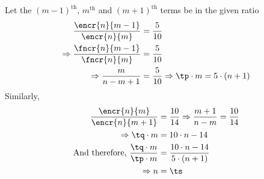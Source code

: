 
\watchout

\ifprintanswers
\fi 

\begin{solution}[\halfpage]
	Let the $(m-1)^{\text{th}}$, $m^{\text{th}}$ and $(m+1)^{\text{th}}$ terms be in the given ratio
	\begin{align}
		\dfrac{\encr{n}{m-1}}{\encr{n}{m}} &= \dfrac{\vbone}{\vbtwo} \\
		\Rightarrow \dfrac{\fncr{n}{m-1}}{\fncr{n}{m}} &= \dfrac{\vbone}{\vbtwo} \\
		\Rightarrow \dfrac{m}{n-m+1} &= \dfrac{\vbone}{\vbtwo} \Rightarrow \tp\cdot m = \vbone\cdot(n+1)
	\end{align}
	Similarly,
	\begin{align}
		\dfrac{\encr{n}{m}}{\encr{n}{m+1}} &= \dfrac{\vbtwo}{\vbthree} \Rightarrow \dfrac{m+1}{n-m} = \dfrac{\vbtwo}{\vbthree} \\
		\Rightarrow \tq\cdot m &= \vbtwo\cdot n - \vbthree \\
		\text{And therefore, } \dfrac{\tq\cdot m}{\tp\cdot m} &= \dfrac{\vbtwo\cdot n - \vbthree}{\vbone\cdot(n+1)} \\
		\Rightarrow n &= \ts
	\end{align}
\end{solution}
